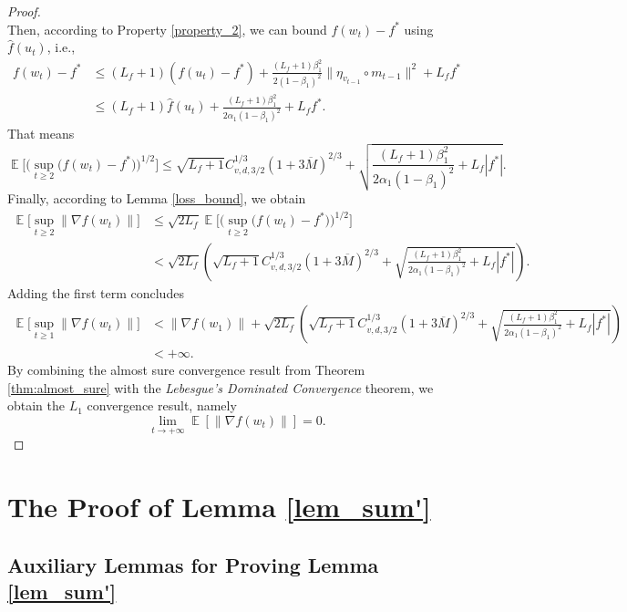 \documentclass{article} %
\DeclareMathOperator{\Expect}{\mathbb{E}}
\begin{document}
\begin{proof}
\[\]
Then, according to Property \ref{property_2}, we can bound ${f}(w_{t})-f^*$ using $\hat{f}(u_{t})$, i.e.,
\begin{align*}
{f}(w_{t})-f^*&\le (L_{f}+1)(f(u_t)-f^*)+\frac{(L_{f}+1)\beta_{1}^{2}}{2(1-\beta_1)^{2}}\|\eta_{v_{t-1}}\circ m_{t-1}\|^{2}+L_{f}f^*\\&\le (L_{f}+1)\hat{f}(u_{t})+\frac{(L_{f}+1)\beta_{1}^{2}}{2\alpha_{1}(1-\beta_1)^{2}}+L_{f}f^*.
\end{align*}
That means
\[\Expect\Big[\Big(\sup_{t\ge 2}\big(f(w_{t})-f^*\big)\Big)^{1/2}\Big]\le \sqrt{L_{f}+1}C^{1/3}_{v,d,3/2}(1+3\overline{M})^{2/3}+\sqrt{\frac{(L_{f}+1)\beta_{1}^{2}}{2\alpha_{1}(1-\beta_1)^{2}}+L_{f}|f^*|}.\]
Finally, according to Lemma \ref{loss_bound}, we obtain
\begin{align*}
\Expect\Big[\sup_{t\ge 2}\|\nabla f(w_{t})\|\Big]&\le \sqrt{2L_{f}}\Expect\Big[\Big(\sup_{t\ge 2}\big(f(w_{t})-f^*\big)\Big)^{1/2}\Big]\\&<\sqrt{2L_{f}}\left(\sqrt{L_{f}+1}C^{1/3}_{v,d,3/2}(1+3\overline{M})^{2/3}+\sqrt{\frac{(L_{f}+1)\beta_{1}^{2}}{2\alpha_{1}(1-\beta_1)^{2}}+L_{f}|f^*|}\right).
\end{align*}
Adding the first term concludes
\begin{align*}
\Expect\Big[\sup_{t\ge 1}\|\nabla f(w_{t})\|\Big]&<\|\nabla f(w_{1})\|+ \sqrt{2L_{f}}\left(\sqrt{L_{f}+1}C^{1/3}_{v,d,3/2}(1+3\overline{M})^{2/3}+\sqrt{\frac{(L_{f}+1)\beta_{1}^{2}}{2\alpha_{1}(1-\beta_1)^{2}}+L_{f}|f^*|}\right)\\&<+\infty.
\end{align*}
By combining the almost sure convergence result from Theorem \ref{thm:almost_sure} with the \emph{Lebesgue's Dominated Convergence} theorem, we obtain the $L_1$ convergence result, namely
\[\lim_{t \rightarrow +\infty} \Expect[\|\nabla f(w_{t})\|] = 0. \tag*{\qedhere}\]
\end{proof}

\section{The Proof of Lemma \ref{lem_sum'}}\label{jiqweqwe}

\subsection{Auxiliary Lemmas for Proving Lemma \ref{lem_sum'}}
\end{document}
